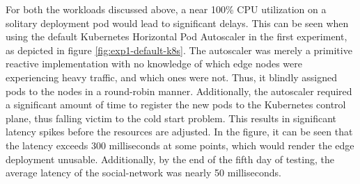 For both the workloads discussed above, a near 100\% CPU utilization on a solitary deployment pod would lead to significant delays. This can be seen when using the default Kubernetes Horizontal Pod Autoscaler in the first experiment, as depicted in figure \ref{fig:exp1-default-k8s}. The autoscaler was merely a primitive reactive implementation with no knowledge of which edge nodes were experiencing heavy traffic, and which ones were not. Thus, it blindly assigned pods to the nodes in a round-robin manner. Additionally, the autoscaler required a significant amount of time to register the new pods to the Kubernetes control plane, thus falling victim to the cold start problem. This results in significant latency spikes before the resources are adjusted. In the figure, it can be seen that the latency exceeds 300 milliseconds at some points, which would render the edge deployment unusable. Additionally, by the end of the fifth day of testing, the average latency of the social-network was nearly 50 milliseconds.\par

\begin{center}
\begin{minipage}{\linewidth}
    \label{fig:exp2-default-k8s}
\end{minipage}
\end{center}

